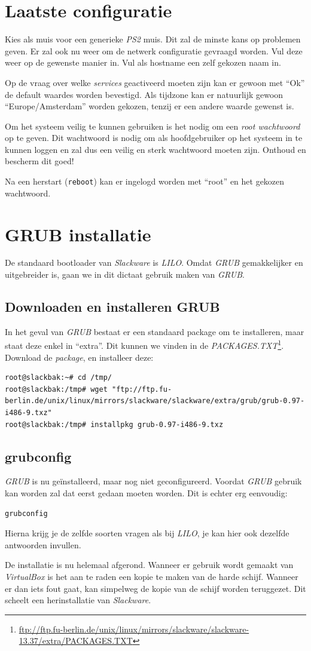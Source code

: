 \section{Laatste configuratie}
Kies als muis voor een generieke \emph{PS2} muis. Dit zal de minste kans op problemen geven. 
Er zal ook nu weer om de netwerk configuratie gevraagd worden. Vul deze weer op de gewenste manier in. Vul als hostname een zelf gekozen naam in.

Op de vraag over welke \emph{services} geactiveerd moeten zijn kan er gewoon met ``Ok'' de default waardes worden bevestigd. Als tijdzone kan er natuurlijk gewoon ``Europe/Amsterdam'' worden gekozen, tenzij er een andere waarde gewenst is. 

Om het systeem veilig te kunnen gebruiken is het nodig om een \emph{root wachtwoord} op te geven. Dit wachtwoord is nodig om als hoofdgebruiker op het systeem in te kunnen loggen en zal dus een veilig en sterk wachtwoord moeten zijn. Onthoud en bescherm dit goed! 

Na een herstart (\texttt{reboot}) kan er ingelogd worden met ``root'' en het gekozen wachtwoord. 

\section{GRUB installatie}
De standaard bootloader van \emph{Slackware} is \emph{LILO}. Omdat \emph{GRUB} gemakkelijker en uitgebreider is, gaan we in dit dictaat gebruik maken van \emph{GRUB}.

\subsection{Downloaden en installeren GRUB}
In het geval van \emph{GRUB} bestaat er een standaard package om te installeren, maar staat deze enkel in ``extra''. Dit kunnen we vinden in de \emph{PACKAGES.TXT}\footnote{\url{ftp://ftp.fu-berlin.de/unix/linux/mirrors/slackware/slackware-13.37/extra/PACKAGES.TXT}}. Download de \emph{package}, en installeer deze: 
\begin{lstlisting}
root@slackbak:~# cd /tmp/
root@slackbak:/tmp# wget "ftp://ftp.fu-berlin.de/unix/linux/mirrors/slackware/slackware/extra/grub/grub-0.97-i486-9.txz"
root@slackbak:/tmp# installpkg grub-0.97-i486-9.txz 
\end{lstlisting}

\subsection{grubconfig}
\emph{GRUB} is nu ge\"{i}nstalleerd, maar nog niet geconfigureerd. Voordat \emph{GRUB} gebruik kan worden zal dat eerst gedaan moeten worden. Dit is echter erg eenvoudig:
\begin{lstlisting}
grubconfig
\end{lstlisting}
Hierna krijg je de zelfde soorten vragen als bij \emph{LILO}, je kan hier ook dezelfde antwoorden invullen.

De installatie is nu helemaal afgerond. Wanneer er gebruik wordt gemaakt van \emph{VirtualBox} is het aan te raden een kopie te maken van de harde schijf. Wanneer er dan iets fout gaat, kan simpelweg de kopie van de schijf worden teruggezet. Dit scheelt een herinstallatie van \emph{Slackware}. 
